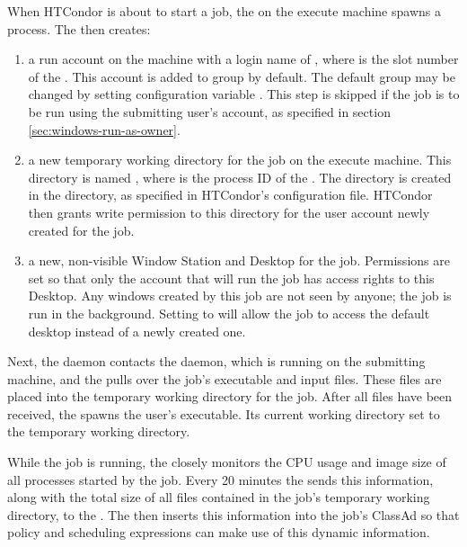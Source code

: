 When HTCondor is about to start a job, the  on the execute
machine spawns a  process.  The  then
creates:
\begin{enumerate}

\item a run account on the machine with a login name of
, where  is the slot number of the
.  This account is added to group  by default.
The default group may be changed by setting configuration variable
.
This step is
skipped if the job is to be run using the submitting user's account,
as specified in section \ref{sec:windows-run-as-owner}.

\item a new temporary working directory for the job on the execute machine.
This directory is
named , where  is the process ID of the 
.
The directory is created in the  directory,
as specified in HTCondor's configuration file.  
HTCondor then grants write
permission to this directory for the user account newly created for the
job.

\item a new, non-visible Window Station and Desktop for the job.
Permissions are set so that only the account that will run the job has
access rights to this Desktop.  Any windows created by this job are
not seen by anyone; the job is run in the background.
Setting  to 
will allow the job to access the
default desktop instead of a newly created one.

\end{enumerate}

Next, the  daemon contacts the  daemon, 
which is running on the submitting machine, 
and the  pulls over the job's executable and input files.
These files are placed into the temporary working directory
for the job.  After all files have been received, the  spawns
the user's executable.  Its current working directory set to the
temporary working directory.

While the job is running, the  closely monitors the CPU
usage and image size of all processes started by the job.
Every 20 minutes the  sends this information,
along with the total size of all files contained in the job's
temporary working directory, to the .
The  then
inserts this information into the job's ClassAd so that policy and
scheduling expressions can make use of this dynamic information.

